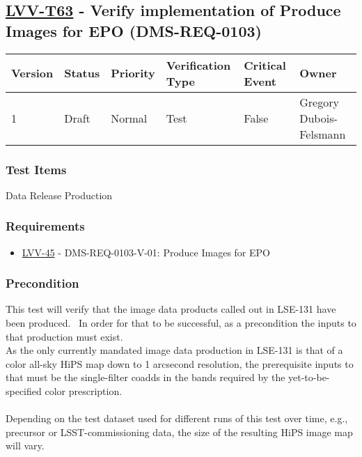\hypertarget{lvv-t63---verify-implementation-of-produce-images-for-epo-dms-req-0103}{%
\subsection{\texorpdfstring{\href{https://jira.lsstcorp.org/secure/Tests.jspa\#/testCase/LVV-T63}{LVV-T63}
- Verify implementation of Produce Images for EPO
(DMS-REQ-0103)}{LVV-T63 - Verify implementation of Produce Images for EPO (DMS-REQ-0103)}}\label{lvv-t63---verify-implementation-of-produce-images-for-epo-dms-req-0103}}

\begin{longtable}[]{@{}llllll@{}}
\toprule
Version & Status & Priority & Verification Type & Critical Event &
Owner\tabularnewline
\midrule
\endhead
1 & Draft & Normal & Test & False & Gregory
Dubois-Felsmann\tabularnewline
\bottomrule
\end{longtable}

\hypertarget{test-items-39}{%
\subsubsection{Test Items}\label{test-items-39}}

Data Release Production

\hypertarget{requirements-40}{%
\subsubsection{Requirements}\label{requirements-40}}

\begin{itemize}
\tightlist
\item
  \href{https://jira.lsstcorp.org/browse/LVV-45}{LVV-45} -
  DMS-REQ-0103-V-01: Produce Images for EPO
\end{itemize}

\hypertarget{precondition-3}{%
\subsubsection{Precondition}\label{precondition-3}}

This test will verify that the image data products called out in LSE-131
have been produced. ~In order for that to be successful, as a
precondition the inputs to that production must exist.\\
As the only currently mandated image data production in LSE-131 is that
of a color all-sky HiPS map down to 1 arcsecond resolution, the
prerequisite inputs to that must be the single-filter coadds in the
bands required by the yet-to-be-specified color prescription.\\
~\\
Depending on the test dataset used for different runs of this test over
time, e.g., precursor or LSST-commissioning data, the size of the
resulting HiPS image map will vary.

